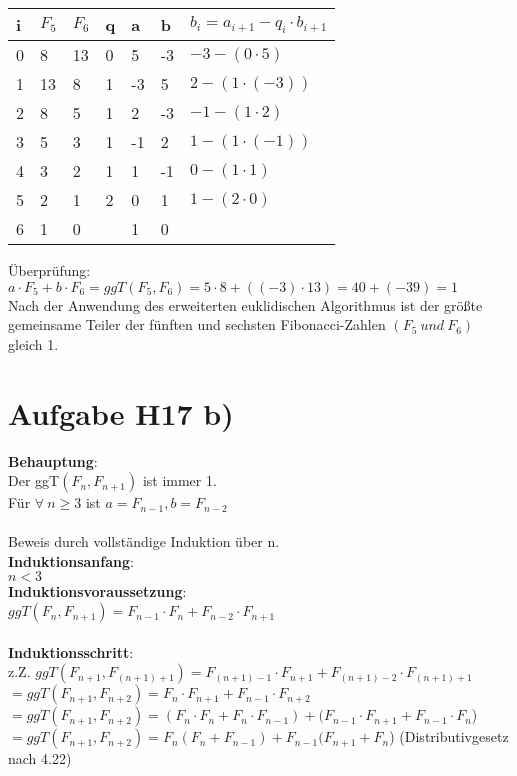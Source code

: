 \documentclass[11pt,a4paper]{article}
\begin{document}
\begin{center}
	\begin{tabular}{ | l | l | l | l | l | l | l|}
		\hline
		i&$F_5$&$F_6$&q&a&b&$b_i=a_{i+1}-q_i \cdot b_{i+1} $ \\ \hline	\hline	
		0&8&13&0&5&-3&$-3-(0 \cdot 5 )$ \\ \hline
		1&13&8&1&-3&5&$2-(1 \cdot (-3) )$ \\ \hline
		2&8&5&1&2&-3&$-1-(1 \cdot 2)$\\ \hline
		3&5&3&1&-1&2&$1-(1 \cdot (-1))$ \\ \hline
		4&3&2&1&1&-1&$0-(1 \cdot 1)$ \\ \hline
		5&2&1&2&0&1&$1-(2\cdot 0)$ \\ \hline
		6&1&0&&1&0&\\ \hline
	\end{tabular}
\end{center}

Überprüfung:\\
$a\cdot F_5 +b \cdot F_6 = ggT(F_5,F_6) = 5 \cdot 8 + ((-3)\cdot 13) = 40+(-39)=1$\\
Nach der Anwendung des erweiterten euklidischen Algorithmus ist der größte gemeinsame Teiler der fünften und sechsten Fibonacci-Zahlen $(F_5~und~F_6)$ gleich 1.\\

\section*{Aufgabe H17 b)}
\textbf{Behauptung}: \\
Der ggT$(F_n, F_{n+1})$ ist immer 1.\\
Für $\forall~n \geq 3$ ist $a=F_{n-1} , b= F_{n-2}$\\
\\
Beweis durch vollständige Induktion über n.\\
\textbf{Induktionsanfang}:\\
$n<3$
\\
\textbf{Induktionsvoraussetzung}:\\
$ggT(F_n, F_{n+1}) = F_{n-1} \cdot F_n+F_{n-2}\cdot F_{n+1}$\\
\\
\textbf{Induktionsschritt}:\\
z.Z.
$ggT(F_{n+1}, F_{(n+1)+1})=F_{(n+1)-1} \cdot F_{n+1} + F_{(n+1)-2} \cdot F_{(n+1)+1}$\\
$=ggT(F_{n+1}, F_{n+2})=F_{n} \cdot F_{n+1} + F_{n-1} \cdot F_{n+2}$\\
$=ggT(F_{n+1}, F_{n+2})=(F_{n} \cdot F_{n} + F_n \cdot F_{n-1}) + (F_{n-1} \cdot F_{n+1} + F_{n-1} \cdot F_{n}$)\\
$=ggT(F_{n+1}, F_{n+2})=F_{n} (F_{n} + F_{n-1}) + F_{n-1} (F_{n+1} + F_{n}$) (Distributivgesetz nach 4.22)\\
\end{document}
